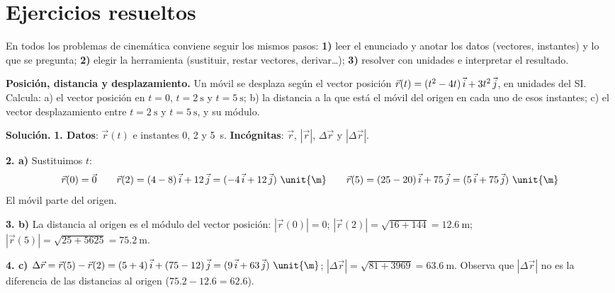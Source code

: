 
\section{Ejercicios resueltos}\label{sec:ud8-resueltos}

En todos los problemas de cinemática conviene seguir los mismos pasos: \textbf{1)} leer el enunciado y anotar los datos (vectores,
instantes) y lo que se pregunta; \textbf{2)} elegir la herramienta (sustituir, restar vectores, derivar\ldots); \textbf{3)} resolver
con unidades e interpretar el resultado.

\begin{example}
    \textbf{Posición, distancia y desplazamiento.} Un móvil se desplaza según el vector posición \(\vec r(t) = (t^2 - 4t)\,\vec{i} +
    3t^2\,\vec{j}\), en unidades del SI. Calcula: a) el vector posición en \(t = 0\), \(t = \qty{2}{\s}\) y \(t = \qty{5}{\s}\);
    b) la distancia a la que está el móvil del origen en cada uno de esos instantes; c) el vector desplazamiento entre \(t = \qty{2}{\s}\)
    y \(t = \qty{5}{\s}\), y su módulo.

    \textbf{Solución.} \textbf{1. Datos}: \(\vec r(t)\) e instantes 0, 2 y \qty{5}{\s}. \textbf{Incógnitas}: \(\vec r\), \(|\vec r|\),
    \(\Delta\vec r\) y \(|\Delta\vec r|\).

    \textbf{2. a)} Sustituimos \(t\):
    \[ \vec r(0) = \vec 0 \qquad \vec r(2) = (4 - 8)\,\ivec + 12\,\jvec = (-4\,\ivec + 12\,\jvec)~\unit{\m} \qquad
       \vec r(5) = (25 - 20)\,\ivec + 75\,\jvec = (5\,\ivec + 75\,\jvec)~\unit{\m} \]
    El móvil parte del origen.

    \textbf{3. b)} La distancia al origen es el módulo del vector posición: \(|\vec r(0)| = 0\);
    \(|\vec r(2)| = \sqrt{16 + 144} = \qty{12.6}{\m}\); \(|\vec r(5)| = \sqrt{25 + 5625} = \qty{75.2}{\m}\).

    \textbf{4. c)} \(\Delta\vec r = \vec r(5) - \vec r(2) = (5 + 4)\,\ivec + (75 - 12)\,\jvec = (9\,\ivec + 63\,\jvec)~\unit{\m}\);
    \(|\Delta\vec r| = \sqrt{81 + 3969} = \qty{63.6}{\m}\). Observa que \(|\Delta\vec r|\) no es la diferencia de las distancias
    al origen (\(\num{75.2} - \num{12.6} = \num{62.6}\)).
\end{example}

